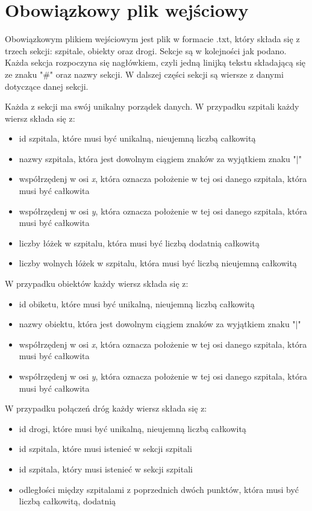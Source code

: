 \documentclass[10pt,a4paper]{article}
\begin{document}
\section{Obowiązkowy plik wejściowy}

Obowiązkowym plikiem wejściowym jest plik w formacie .txt, który składa się z trzech sekcji: szpitale, obiekty oraz drogi. Sekcje są w kolejności jak podano. Każda sekcja rozpoczyna się nagłówkiem, czyli jedną linijką tekstu składającą się ze znaku "\#" oraz nazwy sekcji. W dalszej części sekcji są wiersze z danymi dotyczące danej sekcji.

Każda z sekcji ma swój unikalny porządek danych. W przypadku szpitali każdy wiersz składa się z:
\begin{itemize}
\item id szpitala, które musi być unikalną, nieujemną liczbą całkowitą
\item nazwy szpitala, która jest dowolnym ciągiem znaków za wyjątkiem znaku "$\mid$"
\item współrzędenj w osi \textit{x}, która oznacza położenie w tej osi danego szpitala, która musi być całkowita
\item współrzędenj w osi \textit{y}, która oznacza położenie w tej osi danego szpitala, która musi być całkowita
\item liczby łóżek w szpitalu, która musi być liczbą dodatnią całkowitą
\item liczby wolnych łóżek w szpitalu, która musi być liczbą nieujemną całkowitą
\end{itemize}
W przypadku obiektów każdy wiersz składa się z:
\begin{itemize}
\item id obiketu, które musi być unikalną, nieujemną liczbą całkowitą
\item nazwy obiektu, która jest dowolnym ciągiem znaków za wyjątkiem znaku "$\mid$"
\item współrzędenj w osi \textit{x}, która oznacza położenie w tej osi danego szpitala, która musi być całkowita
\item współrzędenj w osi \textit{y}, która oznacza położenie w tej osi danego szpitala, która musi być całkowita
\end{itemize}
W przypadku połączeń dróg każdy wiersz składa się z:
\begin{itemize}
\item id drogi, które musi być unikalną, nieujemną liczbą całkowitą
\item id szpitala, które musi istenieć w sekcji szpitali
\item id szpitala, który musi istenieć w sekcji szpitali
\item odległości między szpitalami z poprzednich dwóch punktów, która musi być liczbą całkowitą, dodatnią
\end{itemize}
\end{document}
